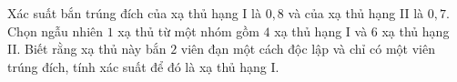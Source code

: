 \begin{ex}%
	Xác suất bắn trúng đích của xạ thủ hạng I là $0{,}8$ và của xạ thủ hạng II là $0{,}7$. Chọn ngẫu nhiên $1$ xạ thủ từ một nhóm gồm $4$ xạ thủ hạng I và $6$ xạ thủ hạng II. Biết rằng xạ thủ này bắn $2$ viên đạn một cách độc lập và chỉ có một viên trúng đích, tính xác suất để đó là xạ thủ hạng I.
\end{ex}

